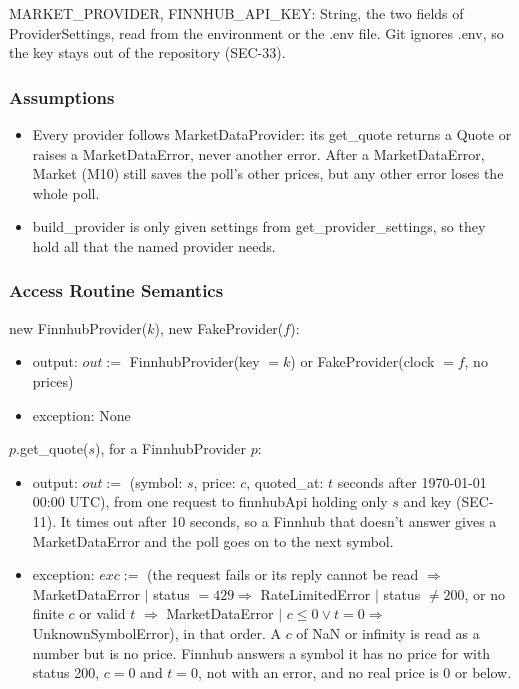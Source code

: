 \documentclass[12pt, titlepage]{article}
\begin{document}
\medskip
\noindent MARKET\_PROVIDER, FINNHUB\_API\_KEY: String, the two fields of
ProviderSettings, read from the environment or the .env file. Git ignores
.env, so the key stays out of the repository (SEC-33).

\subsubsection{Assumptions}

\begin{itemize}
\item Every provider follows MarketDataProvider: its get\_quote returns a Quote
  or raises a MarketDataError, never another error. After a MarketDataError,
  Market (M10) still saves the poll's other prices, but any other error loses
  the whole poll.
\item build\_provider is only given settings from get\_provider\_settings, so
  they hold all that the named provider needs.
\end{itemize}

\subsubsection{Access Routine Semantics}

\noindent new FinnhubProvider($k$), new FakeProvider($f$):
\begin{itemize}
\item output: $out :=$ FinnhubProvider(key $= k$) or FakeProvider(clock $= f$,
  no prices)
\item exception: None
\end{itemize}

\noindent $p$.get\_quote($s$), for a FinnhubProvider $p$:
\begin{itemize}
\item output: $out :=$ (symbol: $s$, price: $c$, quoted\_at: $t$ seconds after
  1970-01-01 00:00 UTC), from one request to finnhubApi holding only $s$ and
  key (SEC-11). It times out after 10 seconds, so a Finnhub that doesn't
  answer gives a MarketDataError and the poll goes on to the next symbol.
\item exception: $exc :=$ (the request fails or its reply cannot be read
  $\Rightarrow$ \mbox{MarketDataError} $|$ status $= 429 \Rightarrow$ RateLimitedError
  $|$ status $\neq 200$, or no finite $c$ or valid $t$ $\Rightarrow$
  \mbox{MarketDataError} $|$ $c \leq 0 \lor t = 0 \Rightarrow$ UnknownSymbolError), in
  that order. A $c$ of NaN or infinity is read as a number but is no price.
  Finnhub answers a symbol it has no price for with status 200, $c = 0$ and
  $t = 0$, not with an error, and no real price is 0 or below.
\end{itemize}
\end{document}

